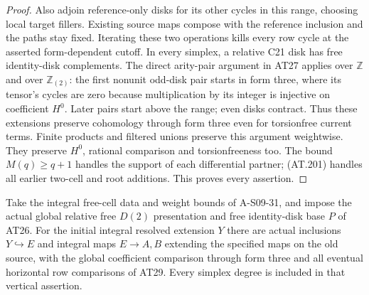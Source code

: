 \begin{proof}
Also adjoin reference-only disks for its other cycles in this
range, choosing local target fillers. Existing source maps compose
with the reference inclusion and the paths stay fixed.
Iterating these two operations kills every row cycle at the
asserted form-dependent cutoff.
In every simplex, a relative C21 disk has free identity-disk
complements. The direct arity-pair argument in AT27 applies over
$\mathbb Z$ and over $\mathbb Z_{(2)}$: the first nonunit
odd-disk pair starts in form three, where its tensor's cycles
are zero because multiplication by its integer is injective on
coefficient $H^0$. Later pairs start above the range; even disks
contract. Thus these extensions preserve cohomology through form
three even for torsionfree current terms. Finite products and
filtered unions preserve this argument weightwise.
They preserve $H^0$, rational comparison and torsionfreeness too.
The bound $M(q)\geq q+1$ handles the support of each differential
partner; \textup{(AT.201)} handles all earlier two-cell and root
additions. This proves every assertion.
\end{proof}

\begin{corollary}
\label{AT29b}
Take the integral free-cell data and weight bounds of A-S09-31,
and impose the actual global relative free $D(2)$ presentation
and free identity-disk base $P$ of AT26.
For the initial integral resolved extension $Y$ there are actual
inclusions $Y\hookrightarrow E$ and integral maps $E\to A,B$
extending the specified maps on the old source, with the global
coefficient comparison through form three and all eventual
horizontal row comparisons of AT29.
Every simplex degree is included in that vertical assertion.
\end{corollary}

